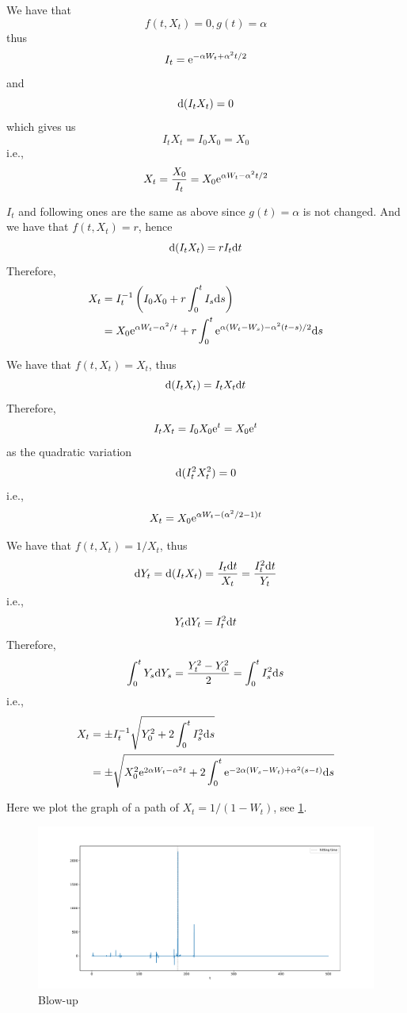 \documentclass{homework}
\begin{document}
    \problem
    \begin{subproblem}[(\alph*)]
        \item
        We have that
        \[f(t,X_t)=0,g(t)=\alpha\]
        thus
        \[I_t=\mathrm e^{-\alpha W_t+\alpha^2t/2}\]
        and
        \[\mathrm d(I_tX_t)=0\]
        which gives us
        \[I_tX_t=I_0X_0=X_0\]
        i.e.,
        \[X_t=\frac{X_0}{I_t}=X_0\mathrm e^{\alpha W_t-\alpha^2t/2}\]

        \item
        $I_t$ and following ones are the same as above
        since $g(t)=\alpha$ is not changed.
        And we have that $f(t,X_t)=r$, hence
        \[\mathrm d(I_tX_t)=rI_t\mathrm d t\]
        Therefore,
        \[\begin{aligned}
            X_t&=I_t^{-1}\left(I_0X_0+r\int_0^tI_s\mathrm d s\right)\\
            &=X_0\mathrm e^{\alpha W_t-\alpha^2/t}+r\int_0^t\mathrm e^{\alpha(W_t-W_s)-\alpha^2(t-s)/2}\mathrm d s
        \end{aligned}\]

        \item
        We have that $f(t,X_t)=X_t$, thus
        \[\mathrm d(I_tX_t)=I_tX_t\mathrm d t\]
        Therefore,
        \[I_tX_t=I_0X_0\mathrm e^t=X_0\mathrm e^t\]
        as the quadratic variation
        \[\mathrm d(I_t^2X_t^2)=0\]
        i.e.,
        \[X_t=X_0\mathrm e^{\alpha W_t-(\alpha^2/2-1)t}\]

        \item
        We have that $f(t,X_t)=1/X_t$, thus
        \[\mathrm d Y_t=\mathrm d(I_tX_t)=\frac{I_t\mathrm d t}{X_t}
        =\frac{I_t^2\mathrm d t}{Y_t}\]
        i.e.,
        \[Y_t\mathrm d Y_t=I_t^2\mathrm d t\]
        Therefore,
        \[\int_0^tY_s\mathrm d Y_s=\frac{Y_t^2-Y_0^2}{2}=\int_0^tI_s^2\mathrm d s\]
        i.e.,
        \[\begin{aligned}
            X_t&=\pm I_t^{-1}\sqrt{Y_0^2+2\int_0^tI_s^2\mathrm d s}\\
            &=\pm\sqrt{X_0^2\mathrm e^{2\alpha W_t-\alpha^2t}
            +2\int_0^t\mathrm e^{-2\alpha(W_s-W_t)+\alpha^2(s-t)}\mathrm d s}
        \end{aligned}\]

    \end{subproblem}

    \problem
    Here we plot the graph of a path of $X_t=1/(1-W_t)$, see \cref{fig:blowup}.
    \begin{figure}[h]
        \centering
        \includegraphics[width=\textwidth]{blowup}
        \caption{Blow-up}
        \label{fig:blowup}
    \end{figure}
\end{document}
